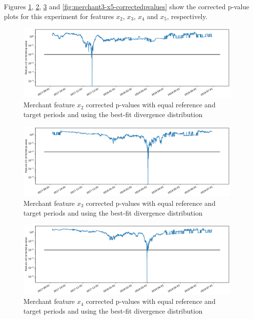 \documentclass[sigconf]{acmart}
\begin{document}
Figures \ref{fig:merchant3-x2-correctedpvalues}, \ref{fig:merchant3-x3-correctedpvalues}, \ref{fig:merchant3-x4-correctedpvalues} and \ref{fig:merchant3-x5-correctedpvalues} show the corrected p-value plots for this experiment for features $x_2$, $x_3$, $x_4$ and $x_5$, respectively.
\begin{figure}[!htb]
    \begin{center}
      \includegraphics[scale=0.25]{figures/merchant3-x2-correctedpvalues.pdf}
      \caption{Merchant feature $x_2$ corrected p-values with equal reference and target periods and using the best-fit divergence distribution}
      \label{fig:merchant3-x2-correctedpvalues}
    \end{center}
\end{figure}
\begin{figure}[!htb]
    \begin{center}
      \includegraphics[scale=0.25]{figures/merchant3-x3-correctedpvalues.pdf}
      \caption{Merchant feature $x_3$ corrected p-values with equal reference and target periods and using the best-fit divergence distribution}
      \label{fig:merchant3-x3-correctedpvalues}
    \end{center}
\end{figure}
\begin{figure}[!htb]
    \begin{center}
      \includegraphics[scale=0.25]{figures/merchant3-x4-correctedpvalues.pdf}
      \caption{Merchant feature $x_4$ corrected p-values with equal reference and target periods and using the best-fit divergence distribution}
      \label{fig:merchant3-x4-correctedpvalues}
    \end{center}
\end{figure}
\end{document}
